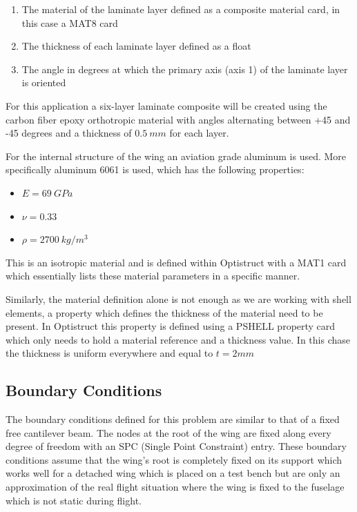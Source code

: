 \begin{enumerate}
\def\labelenumi{\arabic{enumi}.}
\item
  The material of the laminate layer defined as a composite material
  card, in this case a MAT8 card
\item
  The thickness of each laminate layer defined as a float
\item
  The angle in degrees at which the primary axis (axis 1) of the
  laminate layer is oriented
\end{enumerate}

For this application a six-layer laminate composite will be created
using the carbon fiber epoxy orthotropic material with angles
alternating between +45 and -45 degrees and a thickness of \(0.5\ mm\)
for each layer.

For the internal structure of the wing an aviation grade aluminum is
used. More specifically aluminum 6061 is used, which has the following
properties:

\begin{itemize}
\item
  \(E = 69\ GPa\)
\item
  \(\nu = 0.33\)
\item
  \(\rho = 2700\ kg\text{/}m^{3}\)
\end{itemize}

This is an isotropic material and is defined within Optistruct with a
MAT1 card which essentially lists these material parameters in a
specific manner.

Similarly, the material definition alone is not enough as we are working
with shell elements, a property which defines the thickness of the
material need to be present. In Optistruct this property is defined
using a PSHELL property card which only needs to hold a material
reference and a thickness value. In this chase the thickness is uniform
everywhere and equal to \(t = 2mm\)

\subsection{Boundary Conditions} \label{boundary-conditions}

The boundary conditions defined for this problem are similar to that of
a fixed free cantilever beam. The nodes at the root of the wing are
fixed along every degree of freedom with an SPC (Single Point
Constraint) entry. These boundary conditions assume that the wing's root
is completely fixed on its support which works well for a detached wing
which is placed on a test bench but are only an approximation of the
real flight situation where the wing is fixed to the fuselage which is
not static during flight.

